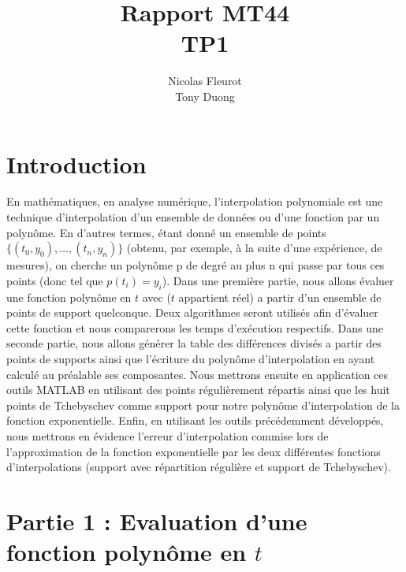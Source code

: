 \documentclass[a4paper,10pt]{report}
\title{Rapport MT44\\\huge{TP1}}
\author{Nicolas Fleurot\\Tony Duong}
\begin{document}
\maketitle

\tableofcontents

\chapter*{Introduction}

    En mathématiques, en analyse numérique, l'interpolation polynomiale est une technique d'interpolation d'un ensemble de données ou d'une fonction par un polynôme. En d'autres termes, étant donné un ensemble de points $\lbrace{(t_{0}, y_{0}), … , (t_{n},y_{n})}\rbrace $ (obtenu, par exemple, à la suite d'une expérience, de mesures), on cherche un polynôme p de degré au plus n qui passe par tous ces points (donc tel que $p(t_{i}) = y_{i}$). 
\newline
\newline
    Dans une première partie, nous allons évaluer une fonction polynôme en $t$ avec ($t$ appartient réel) a partir d’un ensemble de points de support quelconque. Deux algorithmes seront utilisés afin d’évaluer cette fonction et nous comparerons les temps d’exécution respectifs. 
\newline
\newline
Dans une seconde partie, nous allons générer la table des différences divisés a partir des points de supports ainsi que l’écriture du polynôme d’interpolation en ayant calculé au préalable ses composantes. Nous mettrons ensuite en application ces outils MATLAB en utilisant des points régulièrement répartis ainsi que les huit points de Tchebyschev comme support pour notre polynôme d’interpolation de la fonction exponentielle.
\newline
\newline
Enfin, en utilisant les outils précédemment développés, nous mettrons en évidence l’erreur d’interpolation commise lors de l’approximation de la fonction exponentielle par les deux différentes fonctions d’interpolations (support avec répartition régulière et support de Tchebyschev).

\chapter*{Partie 1 : Evaluation d’une fonction polynôme en $t$}
\end{document}
